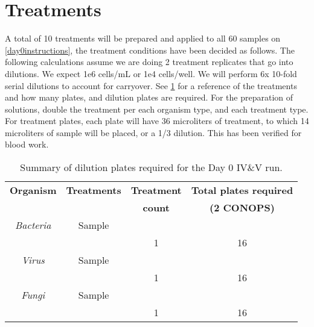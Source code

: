 \documentclass{article}
\begin{document}
\section{Treatments} \label{treatments}
A total of 10 treatments will be prepared and applied to all 60 samples on  \ref{day0instructions}, the treatment conditions have been decided as follows. The following calculations assume we are doing 2 treatment replicates that go into dilutions. We expect 1e6 cells/mL or 1e4 cells/well. We will perform 6x 10-fold serial dilutions to account for carryover. See \ref{tab:dilution-plan-day-0} for a reference of the treatments and how many plates, and dilution plates are required. For the preparation of solutions, double the treatment per each organism type, and each treatment type. For treatment plates, each plate will have 36 microliters of treatment, to which 14 microliters of sample will be placed, or a 1/3 dilution. This has been verified for blood work.

\begin{table} 
  \centering
  \begin{tabular}[]{c|c|c|c}
    \textbf{Organism} & \textbf{Treatments} & \textbf{Treatment} & \textbf{Total plates required} \\
     &  & \textbf{count} & \textbf{(2 CONOPS)} \\
    \hline
    \textit{Bacteria} & Sample  & & \\
    \hline
    & & 1 & 16\\
    \hline
    \textit{Virus} & Sample  & & \\
    \hline
    & & 1 & 16\\
    \hline
    \textit{Fungi} & Sample  & & \\
    \hline
    & & 1 & 16\\
    \hline

  \end{tabular}
  \caption{Summary of dilution plates required for the Day 0 IV\&V run.}
  \label{tab:dilution-plan-day-0}
\end{table}
\end{document}
